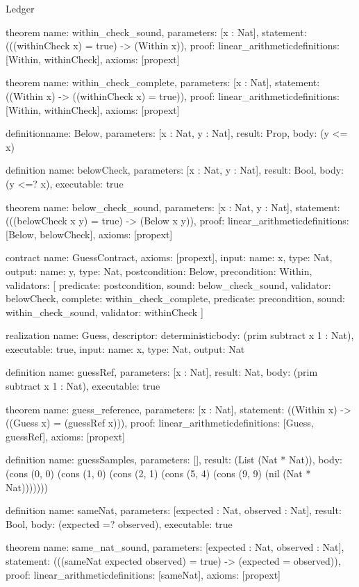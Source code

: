 \begin{lexlean}{Ledger}
\begin{semanticmodule}
theorem{
  name: within_check_sound,
  parameters: [x : Nat],
  statement: (((withinCheck x) = true) -> (Within x)),
  proof: linear_arithmetic{definitions: [Within, withinCheck]},
  axioms: [propext]
}

theorem{
  name: within_check_complete,
  parameters: [x : Nat],
  statement: ((Within x) -> ((withinCheck x) = true)),
  proof: linear_arithmetic{definitions: [Within, withinCheck]},
  axioms: [propext]
}

definition{name: Below, parameters: [x : Nat, y : Nat], result: Prop, body: (y <= x)}

definition{
  name: belowCheck,
  parameters: [x : Nat, y : Nat],
  result: Bool,
  body: (y <=? x),
  executable: true
}

theorem{
  name: below_check_sound,
  parameters: [x : Nat, y : Nat],
  statement: (((belowCheck x y) = true) -> (Below x y)),
  proof: linear_arithmetic{definitions: [Below, belowCheck]},
  axioms: [propext]
}

contract{
  name: GuessContract,
  axioms: [propext],
  input: {name: x, type: Nat},
  output: {name: y, type: Nat},
  postcondition: Below,
  precondition: Within,
  validators: [
    {predicate: postcondition, sound: below_check_sound, validator: belowCheck},
    {
      complete: within_check_complete,
      predicate: precondition,
      sound: within_check_sound,
      validator: withinCheck
    }
  ]
}

realization{
  name: Guess,
  descriptor: deterministic{body: (prim subtract x 1 : Nat)},
  executable: true,
  input: {name: x, type: Nat},
  output: Nat
}

definition{
  name: guessRef,
  parameters: [x : Nat],
  result: Nat,
  body: (prim subtract x 1 : Nat),
  executable: true
}

theorem{
  name: guess_reference,
  parameters: [x : Nat],
  statement: ((Within x) -> ((Guess x) = (guessRef x))),
  proof: linear_arithmetic{definitions: [Guess, guessRef]},
  axioms: [propext]
}

definition{
  name: guessSamples,
  parameters: [],
  result: (List (Nat * Nat)),
  body: (cons (0, 0) (cons (1, 0) (cons (2, 1) (cons (5, 4) (cons (9, 9) (nil (Nat * Nat)))))))
}

definition{
  name: sameNat,
  parameters: [expected : Nat, observed : Nat],
  result: Bool,
  body: (expected =? observed),
  executable: true
}

theorem{
  name: same_nat_sound,
  parameters: [expected : Nat, observed : Nat],
  statement: (((sameNat expected observed) = true) -> (expected = observed)),
  proof: linear_arithmetic{definitions: [sameNat]},
  axioms: [propext]
}


\end{semanticmodule}
\end{lexlean}
